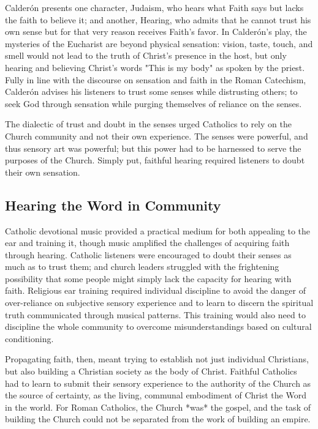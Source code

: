 Calderón presents one character, Judaism, who hears what Faith says but lacks
the faith to believe it; and another, Hearing, who admits that he cannot trust
his own sense but for that very reason receives Faith's favor. 
In Calderón's play, the mysteries of the Eucharist are beyond physical
sensation: vision, taste, touch, and smell would not lead to the truth of
Christ's presence in the host, but only hearing and believing Christ's words
"This is my body" as spoken by the priest. 
Fully in line with the discourse on sensation and faith in the Roman Catechism,
Calderón advises his listeners to trust some senses while distrusting others; to
seek God through sensation while purging themselves of reliance on the senses. 

The dialectic of trust and doubt in the senses urged Catholics to rely on the
Church community and not their own experience. 
The senses were powerful, and thus sensory art was powerful; but this power had
to be harnessed to serve the purposes of the Church. 
Simply put, faithful hearing required listeners to doubt their own sensation. 


\subsection{Hearing the Word in Community}


Catholic devotional music provided a practical medium for both appealing to the
ear and training it, though music amplified the challenges of acquiring faith
through hearing.
Catholic listeners were encouraged to doubt their senses as much as to trust
them; and church leaders struggled with the frightening possibility that some
people might simply lack the capacity for hearing with faith.
Religious ear training required individual discipline to avoid the danger of
over-reliance on subjective sensory experience and to learn to discern the
spiritual truth communicated through musical patterns.
This training would also need to discipline the whole community to overcome
misunderstandings based on cultural conditioning.

Propagating faith, then, meant trying to establish not just individual
Christians, but also building a Christian society as the body of Christ. 
Faithful Catholics had to learn to submit their sensory experience to the
authority of the Church as the source of certainty, as the living, communal
embodiment of Christ the Word in the world.
For Roman Catholics, the Church *was* the gospel, and the task of building
the Church could not be separated from the work of building an empire.

